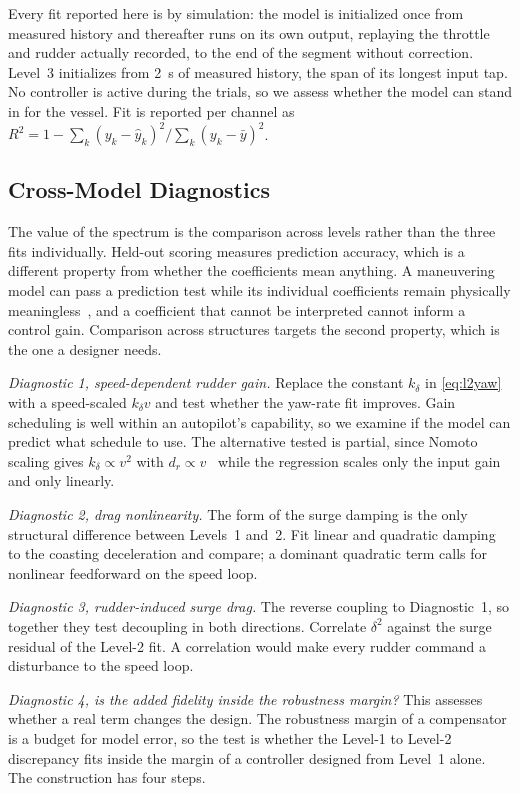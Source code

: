 \documentclass[conference]{IEEEtran}
\begin{document}
Every fit reported here is by simulation: the model is initialized once from measured history and thereafter runs on its own output, replaying the throttle and rudder actually recorded, to the end of the segment without correction. Level~3 initializes from 2~s of measured history, the span of its longest input tap. No controller is active during the trials, so we assess whether the model can stand in for the vessel. Fit is reported per channel as $R^2 = 1-\sum_k(y_k-\hat y_k)^2/\sum_k(y_k-\bar y)^2$.

\subsection{Cross-Model Diagnostics}

The value of the spectrum is the comparison across levels rather than the three fits individually. Held-out scoring measures prediction accuracy, which is a different property from whether the coefficients mean anything. A maneuvering model can pass a prediction test while its individual coefficients remain physically meaningless~\cite{alexandersson2022system}, and a coefficient that cannot be interpreted cannot inform a control gain. Comparison across structures targets the second property, which is the one a designer needs. 

\emph{Diagnostic 1, speed-dependent rudder gain.} Replace the constant $k_\delta$ in \eqref{eq:l2yaw} with a speed-scaled $k_\delta v$ and test whether the yaw-rate fit improves. Gain scheduling is well within an autopilot's capability, so we examine if the model can predict what schedule to use. The alternative tested is partial, since Nomoto scaling gives $k_\delta\propto v^2$ with $d_r\propto v$~\cite{fossen2011handbook} while the regression scales only the input gain and only linearly.

\emph{Diagnostic 2, drag nonlinearity.} The form of the surge damping is the only structural difference between Levels~1 and~2. Fit linear and quadratic damping to the coasting deceleration and compare; a dominant quadratic term calls for nonlinear feedforward on the speed loop.

\emph{Diagnostic 3, rudder-induced surge drag.} The reverse coupling to Diagnostic~1, so together they test decoupling in both directions. Correlate $\delta^2$ against the surge residual of the Level-2 fit. A correlation would make every rudder command a disturbance to the speed loop.

\emph{Diagnostic 4, is the added fidelity inside the robustness margin?} This assesses whether a real term changes the design. The robustness margin of a compensator is a budget for model error, so the test is whether the Level-1 to Level-2 discrepancy fits inside the margin of a controller designed from Level~1 alone. The construction has four steps.
\end{document}
